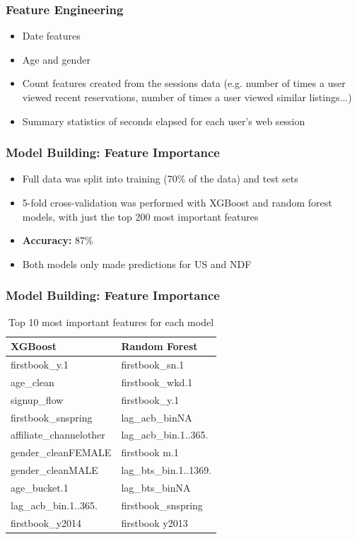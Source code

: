 \documentclass{beamer}
\begin{document}

\begin{frame}
\frametitle{Feature Engineering}
\begin{itemize}
  \item Date features
  \item Age and gender
  \item Count features created from the sessions data (e.g. number of times a user viewed recent reservations, number of times a user viewed similar listings...)
  \item Summary statistics of seconds elapsed for each user’s web session
\end{itemize}
\end{frame}


\begin{frame}
\frametitle{Model Building: Feature Importance}
\begin{itemize}
  \item Full data was split into training (70\% of the data) and test sets
  \item 5-fold cross-validation was performed with XGBoost and random forest models, with just the top 200 most important features
  \item \textbf{Accuracy:} 87\%
  \item Both models only made predictions for US and NDF
\end{itemize}
\end{frame}


\begin{frame}
\frametitle{Model Building: Feature Importance}
\begin{table}[ht]
\centering
\begin{tabular}{| l | l |}
  \hline
  \textbf{XGBoost} & \textbf{Random Forest} \\ 
  \hline
  firstbook\_y.1 & firstbook\_sn.1 \\
  age\_clean & firstbook\_wkd.1 \\
  signup\_flow & firstbook\_y.1 \\
  firstbook\_snspring & lag\_acb\_binNA \\
  affiliate\_channelother & lag\_acb\_bin.1..365. \\
  gender\_cleanFEMALE & firstbook m.1 \\
  gender\_cleanMALE & lag\_bts\_bin.1..1369. \\
  age\_bucket.1 & lag\_bts\_binNA \\
  lag\_acb\_bin.1..365. & firstbook\_snspring \\
  firstbook\_y2014 & firstbook y2013 \\
  \hline
\end{tabular}
\caption{Top 10 most important features for each model}
\end{table}
\end{frame}
\end{document}
